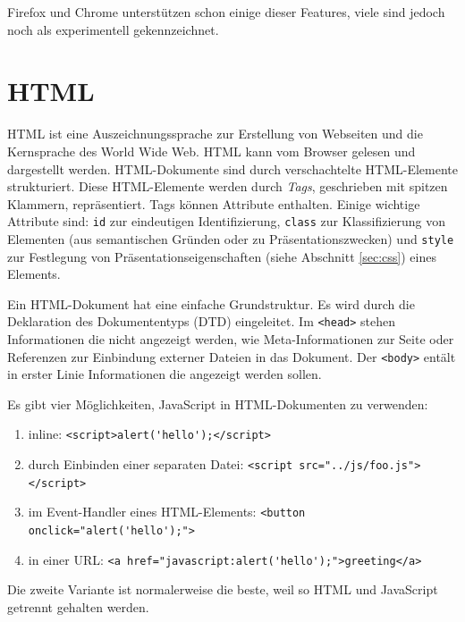 \documentclass[a4paper, 12pt, hidelinks, listof=totoc, listoftables=totoc, bibliography=totoc]{scrreprt}
\newcommand{\html}[1]{\lstinline[language=HTML5, style=inline]|#1|}
\begin{document}
Firefox und Chrome unterstützen schon einige dieser Features, viele sind jedoch noch als experimentell gekennzeichnet.


\section{HTML}


\ac{HTML} ist eine Auszeichnungssprache zur Erstellung von Webseiten und die Kernsprache des World Wide Web. \ac{HTML} kann vom Browser gelesen und dargestellt werden. \ac{HTML}-Dokumente sind durch verschachtelte \ac{HTML}-Elemente strukturiert. Diese \ac{HTML}-Elemente werden durch \emph{Tags}, geschrieben mit spitzen Klammern, repräsentiert. Tags können Attribute enthalten. Einige wichtige Attribute sind: \html{id} zur eindeutigen Identifizierung, \html{class} zur Klassifizierung von Elementen (aus semantischen Gründen oder zu Präsentationszwecken) und \html{style} zur Festlegung von Präsentationseigenschaften (siehe Abschnitt \ref{sec:css}) eines Elements.

Ein \ac{HTML}-Dokument hat eine einfache Grundstruktur. Es wird durch die Deklaration des Dokumententyps (DTD) eingeleitet. Im \html{<head>} stehen Informationen die nicht angezeigt werden, wie Meta-Informationen zur Seite oder Referenzen zur Einbindung externer Dateien in das Dokument. Der \html{<body>} entält in erster Linie Informationen die angezeigt werden sollen.

Es gibt vier Möglichkeiten, JavaScript in \ac{HTML}-Dokumenten zu verwenden:

\begin{enumerate}
\item inline: \html{<script>alert('hello');</script>}
\item durch Einbinden einer separaten Datei: \html{<script src="../js/foo.js"></script>}
\item im Event-Handler eines \ac{HTML}-Elements: \html{<button onclick="alert('hello');">}
\item in einer \ac{URL}: \html{<a href="javascript:alert('hello');">greeting</a>}
\end{enumerate}

Die zweite Variante ist normalerweise die beste, weil so \ac{HTML} und JavaScript getrennt gehalten werden. \cite[S. 311]{flanagan2011.JDG}
\end{document}
